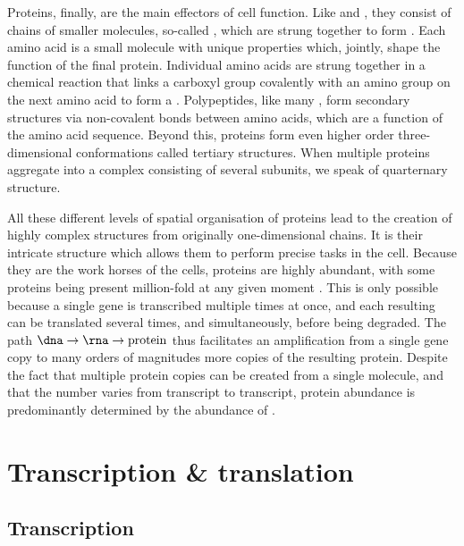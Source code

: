 Proteins, finally, are the main effectors of cell function. Like \dna and \rna,
they consist of chains of smaller molecules, so-called
, which are strung together to form
. Each amino acid is a small molecule with unique
properties which, jointly, shape the function of the final protein. Individual
amino acids are strung together in a chemical reaction that links a carboxyl
group covalently with an amino group on the next amino acid to form a
\citep{Alberts:2002}. Polypeptides, like many \rna[s], form secondary structures
via non-covalent bonds between amino acids, which are a function of the amino
acid sequence. Beyond this, proteins form even higher order three-dimensional
conformations called tertiary structures. When multiple proteins aggregate into
a complex consisting of several subunits, we speak of quarternary structure.

All these different levels of spatial organisation of proteins lead to the
creation of highly complex structures from originally one-dimensional chains. It
is their intricate structure which allows them to perform precise tasks in the
cell. Because they are the work horses of the cells, proteins are highly
abundant, with some proteins being present million-fold at any given moment
\citep{Milo:2013}. This is only possible because a single gene is transcribed
multiple times at once, and each resulting \mrna can be translated several
times, and simultaneously, before being degraded. The path
\(\text{\dna}\rightarrow\text{\rna}\rightarrow\text{protein}\) thus facilitates
an amplification from a single gene copy to many orders of magnitudes more
copies of the resulting protein. Despite the fact that multiple protein copies
can be created from a single \mrna molecule, and that the number varies from
transcript to transcript, protein abundance is predominantly determined by the
abundance of \mrna[s] \citep{Li:2014,Jovanovic:2015,Csardi:2014}.

\section{Transcription \& translation}

\subsection{Transcription}
\label{sec:transcription}


